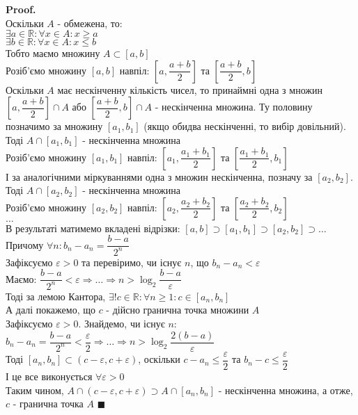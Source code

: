 \documentclass[a4paper, 14pt]{extarticle}
\theoremstyle{theoremdd}
\theoremstyle{theoremdd}
\theoremstyle{theoremdd}
\theoremstyle{theoremdd}
\theoremstyle{theoremdd}
\theoremstyle{theoremdd}
\theoremstyle{theoremdd}
\theoremstyle{theoremdd}
\newenvironment{pf}{\vspace*{-3mm} \textbf{Proof. \\}}{$\blacksquare$}
\begin{document}
	\begin{pf}
	Оскільки $A$ - обмежена, то:\\
	$\exists a \in \mathbb{R}: \forall x \in A: x \geq a$\\
	$\exists b \in \mathbb{R}: \forall x \in A: x \leq b$\\
	Тобто маємо множину $A \subset [a,b]$\\
	Розіб'ємо множину $[a,b]$ навпіл: $\left[a, \dfrac{a+b}{2}\right]$ та $\left[\dfrac{a+b}{2},b \right]$\\
	Оскільки $A$ має нескінченну кількість чисел, то принаймні одна з множин $\left[a, \dfrac{a+b}{2}\right] \cap A$ або $\left[\dfrac{a+b}{2}, b\right] \cap A$ - нескінченна множина. Ту половину позначимо за множину $[a_1,b_1]$ (якщо обидва нескінченні, то вибір довільний). Тоді $A \cap [a_1,b_1]$ - нескінченна множина\\
	Розіб'ємо множину $[a_1,b_1]$ навпіл: $\left[a_1, \dfrac{a_1+b_1}{2}\right]$ та $\left[\dfrac{a_1+b_1}{2},b_1 \right]$\\
	І за аналогічними міркуваннями одна з множин нескінченна, позначу за $[a_2,b_2]$. Тоді $A \cap [a_2,b_2]$ - нескінченна множина\\
	Розіб'ємо множину $[a_2,b_2]$ навпіл: $\left[a_2, \dfrac{a_2+b_2}{2}\right]$ та $\left[\dfrac{a_2+b_2}{2},b_2 \right]$\\
	$\dots$\\
	В результаті матимемо вкладені відрізки: $[a,b] \supset [a_1,b_1] \supset [a_2,b_2] \supset \dots$\\
	Причому $\forall n: b_n - a_n = \dfrac{b-a}{2^n}$\\
	Зафіксуємо $\varepsilon > 0$ та перевіримо, чи існує $n$, що $b_n - a_n < \varepsilon$\\
	Маємо: $\dfrac{b-a}{2^n} < \varepsilon \Rightarrow \dots \Rightarrow n > \log_2 \dfrac{b-a}{\varepsilon}$\\
	Тоді за лемою Кантора, $\exists! c \in \mathbb{R}: \forall n \geq 1: c \in [a_n,b_n]$\\
	А далі покажемо, що $c$ - дійсно гранична точка множини $A$\\
	Зафіксуємо $\varepsilon > 0$. Знайдемо, чи існує $n$: $b_n - a_n = \dfrac{b-a}{2^n} < \dfrac{\varepsilon}{2} \Rightarrow \dots \Rightarrow n > \log_2 \dfrac{2(b-a)}{\varepsilon}$\\
	Тоді $[a_n,b_n] \subset (c-\varepsilon, c+\varepsilon)$, оскільки $c-a_n \leq \dfrac{\varepsilon}{2}$ та $b_n -c \leq \dfrac{\varepsilon}{2}$\\
	І це все виконується $\forall \varepsilon > 0$\\
	Таким чином, $A \cap (c-\varepsilon, c+\varepsilon) \supset A \cap [a_n,b_n]$ - нескінченна множина, а отже, $c$ - гранична точка $A$
	\end{pf}
	\newpage
	
\end{document}
